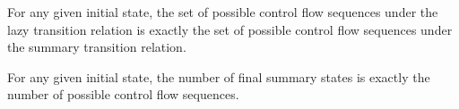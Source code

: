 \begin{corollary}
For any given initial state, the set of possible control flow sequences under the lazy transition relation is exactly the set of possible control flow sequences under the summary transition relation.
\end{corollary}

\begin{corollary}
For any given initial state, the number of final summary states is exactly the number of possible control flow sequences.
\end{corollary}


